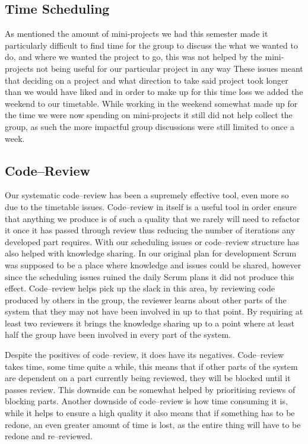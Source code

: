 \subsection{Time Scheduling}
As mentioned the amount of mini-projects we had this semester made it particularly difficult to find time for the group to discuss the what we wanted to do, and where we wanted the project to go, this was not helped by the mini-projects not being useful for our particular project in any way
These issues meant that deciding on a project and what direction to take said project took longer than we would have liked and in order to make up for this time loss we added the weekend to our timetable.
While working in the weekend somewhat made up for the time we were now spending on mini-projects it still did not help collect the group, as such the more impactful group discussions were still limited to once a week.

\subsection{Code--Review}
Our systematic code--review has been a supremely effective tool, even more so due to the timetable issues.
Code--review in itself is a useful tool in order ensure that anything we produce is of such a quality that we rarely will need to refactor it once it has passed through review thus reducing the number of iterations any developed part requires.
With our scheduling issues or code--review structure has also helped with knowledge sharing.
In our original plan for development Scrum was supposed to be a place where knowledge and issues could be shared, however since the scheduling issues ruined the daily Scrum plans it did not produce this effect.
Code--review helps pick up the slack in this area, by reviewing code produced by others in the group, the reviewer learns about other parts of the system that they may not have been involved in up to that point.
By requiring at least two reviewers it brings the knowledge sharing up to a point where at least half the group have been involved in every part of the system.

Despite the positives of code--review, it does have its negatives.
Code--review takes time, some time quite a while, this means that if other parts of the system are dependent on a part currently being reviewed, they will be blocked until it passes review.
This downside can be somewhat helped by prioritising reviews of blocking parts.
Another downside of code--review is how time consuming it is, while it helps to ensure a high quality it also means that if something has to be redone, an even greater amount of time is lost, as the entire thing will have to be redone and re--reviewed.

